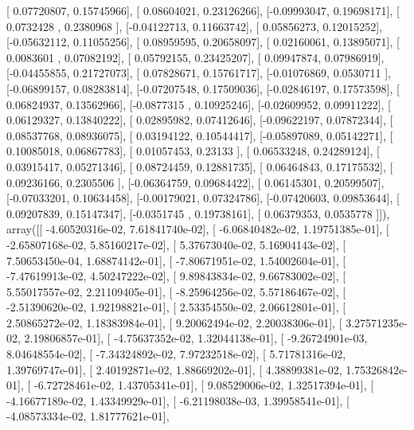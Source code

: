 \documentclass{article}
\begin{document}
       [ 0.07720807,  0.15745966],
       [ 0.08604021,  0.23126266],
       [-0.09993047,  0.19698171],
       [ 0.0732428 ,  0.2380968 ],
       [-0.04122713,  0.11663742],
       [ 0.05856273,  0.12015252],
       [-0.05632112,  0.11055256],
       [ 0.08959595,  0.20658097],
       [ 0.02160061,  0.13895071],
       [ 0.0083601 ,  0.07082192],
       [ 0.05792155,  0.23425207],
       [ 0.09947874,  0.07986919],
       [-0.04455855,  0.21727073],
       [ 0.07828671,  0.15761717],
       [-0.01076869,  0.0530711 ],
       [-0.06899157,  0.08283814],
       [-0.07207548,  0.17509036],
       [-0.02846197,  0.17573598],
       [ 0.06824937,  0.13562966],
       [-0.0877315 ,  0.10925246],
       [-0.02609952,  0.09911222],
       [ 0.06129327,  0.13840222],
       [ 0.02895982,  0.07412646],
       [-0.09622197,  0.07872344],
       [ 0.08537768,  0.08936075],
       [ 0.03194122,  0.10544417],
       [-0.05897089,  0.05142271],
       [ 0.10085018,  0.06867783],
       [ 0.01057453,  0.23133   ],
       [ 0.06533248,  0.24289124],
       [ 0.03915417,  0.05271346],
       [ 0.08724459,  0.12881735],
       [ 0.06464843,  0.17175532],
       [ 0.09236166,  0.2305506 ],
       [-0.06364759,  0.09684422],
       [ 0.06145301,  0.20599507],
       [-0.07033201,  0.10634458],
       [-0.00179021,  0.07324786],
       [-0.07420603,  0.09853644],
       [ 0.09207839,  0.15147347],
       [-0.0351745 ,  0.19738161],
       [ 0.06379353,  0.0535778 ]]), array([[ -4.60520316e-02,   7.61841740e-02],
       [ -6.06840482e-02,   1.19751385e-01],
       [ -2.65807168e-02,   5.85160217e-02],
       [  5.37673040e-02,   5.16904143e-02],
       [  7.50653450e-04,   1.68874142e-01],
       [ -7.80671951e-02,   1.54002604e-01],
       [ -7.47619913e-02,   4.50247222e-02],
       [  9.89843834e-02,   9.66783002e-02],
       [  5.55017557e-02,   2.21109405e-01],
       [ -8.25964256e-02,   5.57186467e-02],
       [ -2.51390620e-02,   1.92198821e-01],
       [  2.53354550e-02,   2.06612801e-01],
       [  2.50865272e-02,   1.18383984e-01],
       [  9.20062494e-02,   2.20038306e-01],
       [  3.27571235e-02,   2.19806857e-01],
       [ -4.75637352e-02,   1.32044138e-01],
       [ -9.26724901e-03,   8.04648554e-02],
       [ -7.34324892e-02,   7.97232518e-02],
       [  5.71781316e-02,   1.39769747e-01],
       [  2.40192871e-02,   1.88669202e-01],
       [  4.38899381e-02,   1.75326842e-01],
       [ -6.72728461e-02,   1.43705341e-01],
       [  9.08529006e-02,   1.32517394e-01],
       [ -4.16677189e-02,   1.43349929e-01],
       [ -6.21198038e-03,   1.39958541e-01],
       [ -4.08573334e-02,   1.81777621e-01],
\end{document}
